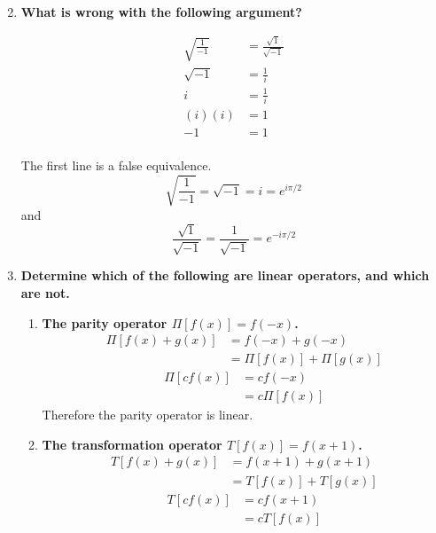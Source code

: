 \documentclass[9pt]{report}
\begin{document}
\begin{enumerate}
\[        \]
      \item \textbf{What is wrong with the following argument?}

        \[
          \begin{align}
          \sqrt{\frac{1}{-1}} &= \frac{\sqrt{1}}{\sqrt{-1} } \\
          \sqrt{-1} &= \frac{1}{i} \\
          i &= \frac{1}{i} \\
          (i)(i) &= 1 \\
          -1 &= 1\\
        \end{align}
        \]

        The first line is a false equivalence.
        \[
          \sqrt{\frac{1}{-1}} = \sqrt{-1} = i = e^{i\pi/2}
        \]
        and
        \[
          \frac{\sqrt{1}}{\sqrt{-1} }= \frac{1}{\sqrt{-1}} = e^{-i\pi/2}
        \]
      \item
        \textbf{Determine which of the following are linear operators, and which
        are not.}
        \begin{enumerate}
          \item \textbf{The parity operator $\Pi[f(x)]=f(-x)$.}
            \[
              \begin{align}
                \Pi[f(x) + g(x)] &= f(-x) + g(-x)\\
                                 &= \Pi[f(x)] + \Pi[g(x)]
              \end{align}
            \]
            \[
              \begin{align}
                \Pi[cf(x)] &= cf(-x) \\
                           &= c\Pi[f(x)]
              \end{align}
            \]
            Therefore the parity operator is linear.
          \item \textbf{The transformation operator $T[f(x)] = f(x+1)$.}
            \[
              \begin{align}
                T[f(x) + g(x)] &= f(x+1) + g(x+1)\\
                               &= T[f(x)] + T[g(x)]
              \end{align}
            \]
            \[
              \begin{align}
                T[cf(x)] &= cf(x+1)\\
                         &= cT[f(x)]
              \end{align}
\]
\end{enumerate}
\end{enumerate}
\end{document}
